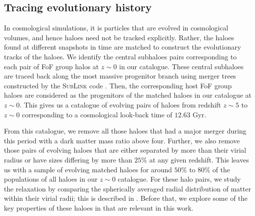 \subsection{Tracing evolutionary history}
\label{sec:methods-tracehals}
In cosmological simulations, it is particles that are evolved in cosmological volumes, and hence haloes need not be tracked explicitly. Rather, the haloes found at different snapshots in time are matched to construct the evolutionary tracks of the haloes. We identify the central subhaloes pairs corresponding to each pair of FoF group halos at $z\sim 0$ in our catalogue. These central subhaloes are traced back along the most massive progenitor branch using merger trees constructed by the \textsc{SubLink} code \citep{2015RodriguezGeneletalSubLink}. Then, the corresponding host FoF group haloes are considered as the progenitors of the matched haloes in our catalogue at $z \sim 0$. This gives us a catalogue of evolving pairs of haloes from redshift $z \sim 5$ to $z \sim 0$ corresponding to a cosmological look-back time of $12.63$ Gyr.

From this catalogue, we remove all those haloes that had a major merger during this period with a dark matter mass ratio above four. Further, we also remove those pairs of evolving haloes that are either separated by more than their virial radius or have sizes differing by more than $25\% $ at any given redshift. This leaves us with a sample of evolving matched haloes for around $50\%$ to $80\%$ of the populations of all haloes in our $z \sim 0$ catalogue. For these halo pairs, we study the relaxation by comparing the spherically averaged radial distribution of matter within their virial radii; this is described in  . Before that, we explore some of the key properties of these haloes in  that are relevant in this work.


